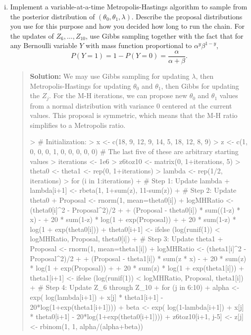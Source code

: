 \documentclass{article}
\begin{document}
\begin{enumerate}[(i)]
\item 
Implement a variable-at-a-time Metropolis-Hastings algorithm to sample
from the posterior distribution of 
$(\theta_0, \theta_1, \lambda)$.  Describe the proposal distributions you
use for this purpose and how you decided how long to run the chain.
For the updates of $Z_6, \ldots, Z_{10}$, use Gibbs sampling together with
the fact that for any Bernoulli variable $Y$ with mass function proportional
to $\alpha^y\beta^{1-y}$,
\[
P(Y=1) = 1-P(Y=0) = \frac{\alpha}{\alpha+\beta}.
\]
\begin{quotation}{\bf Solution:}
We may use Gibbs sampling for updating $\lambda$, then Metropolis-Hastings
for updating $\theta_0$ and $\theta_1$, then Gibbs for updating the $Z_j$.
For the M-H iterations, we can propose new $\theta_0$ and $\theta_1$ values 
from a normal distribution with variance 0 centered at the current values.
This proposal is symmetric, which means that the M-H ratio simplifies to a
Metropolis ratio.  
\begin{Schunk}
\begin{Sinput}
> # Initialization:
> x <- c(18, 9, 12, 9, 14, 5, 18, 12, 8, 9)
> z <- c(1, 0, 0, 0, 1, 0, 0, 0, 0, 0) # The last five of these are arbitrary starting values
> iterations <- 1e6
> z6toz10 <- matrix(0, 1+iterations, 5)
> theta0 <- theta1 <- rep(0, 1+iterations)
> lambda <- rep(1/2, iterations)
> for (i in 1:iterations) {
+   # Step 1:  Update lambda
+   lambda[i+1] <- rbeta(1, 1+sum(z), 11-sum(z))
+   # Step 2:  Update theta0
+   Proposal <- rnorm(1, mean=theta0[i])
+   logMHRatio <- (theta0[i]^2 - Proposal^2)/2 + 
+                           (Proposal - theta0[i]) * sum((1-z) * x) -
+                           20 * sum(1-z) * log(1 + exp(Proposal)) +
+                           20 * sum(1-z) * log(1 + exp(theta0[i]))
+   theta0[i+1] <- ifelse (log(runif(1)) < logMHRatio, Proposal, theta0[i])
+   # Step 3:  Update theta1
+   Proposal <- rnorm(1, mean=theta1[i])
+   logMHRatio <- (theta1[i]^2 - Proposal^2)/2 + 
+                           (Proposal - theta1[i]) * sum(z * x) -
+                           20 * sum(z) * log(1 + exp(Proposal)) +
+                           20 * sum(z) * log(1 + exp(theta1[i]))
+   theta1[i+1] <- ifelse (log(runif(1)) < logMHRatio, Proposal, theta1[i])
+   # Step 4:  Update Z_6 through Z_10
+   for (j in 6:10) {
+     alpha <- exp( log(lambda[i+1]) + x[j] * theta1[i+1] - 20*log(1+exp(theta1[i+1])))
+     beta <- exp( log(1-lambda[i+1]) + x[j] * theta0[i+1] - 20*log(1+exp(theta0[i+1])))
+     z6toz10[i+1, j-5] <- z[j] <- rbinom(1, 1, alpha/(alpha+beta)) 
}}
\end{Sinput}
\end{Schunk}
\end{quotation}
\end{enumerate}
\end{document}
